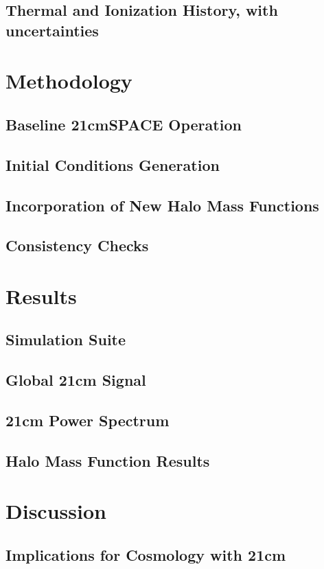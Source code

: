 \documentclass[floats,floatfix,showpacs,amssymb,prd,superscriptaddress,nofootinbib]{revtex4-2} %
\begin{document}
\subsection{Thermal and Ionization History, with uncertainties}


\newpage
\section{Methodology}
\subsection{Baseline 21cmSPACE Operation}
\subsection{Initial Conditions Generation}
\subsection{Incorporation of New Halo Mass Functions}
\subsection{Consistency Checks}

\newpage
\section{Results}
\subsection{Simulation Suite}
\subsection{Global 21cm Signal}
\subsection{21cm Power Spectrum}
\subsection{Halo Mass Function Results}

\newpage
\section{Discussion}
\subsection{Implications for Cosmology with 21cm}
\end{document}
